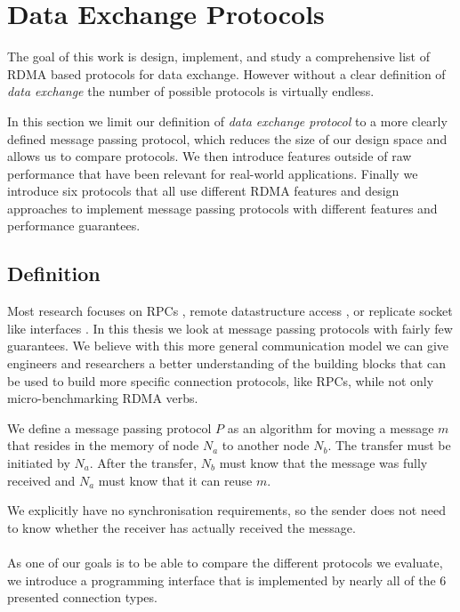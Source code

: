 \section{Data Exchange Protocols}\label{sec:protocols}
The goal of this work is design, implement, and study a comprehensive list of RDMA based protocols for data exchange. 
However without a clear definition of \emph{data exchange} the number of possible protocols is virtually endless.

In this section we limit our definition of \emph{data exchange protocol} to a more clearly defined message passing
protocol, which reduces the size of our design space and allows us to compare protocols. We then introduce
features outside of raw performance that have been relevant for real-world applications. Finally we introduce six 
protocols that all use different RDMA features and design approaches to implement message passing protocols with different 
features and performance guarantees.

\subsection{Definition}\label{sec:proto-def}

Most research focuses on RPCs \cite{anuj-guide, fasst, herd}, remote datastructure access \cite{pilaf, farm}, or replicate 
socket like interfaces \cite{socksdirect}. In this thesis we look at message passing protocols with fairly few guarantees.
We believe with this more general communication model we can give engineers and researchers a better understanding of the 
building blocks that can be  used to build more specific connection protocols, like RPCs, while not only 
micro-benchmarking RDMA verbs.


\begin{defn}
We define a message passing protocol $P$ as an algorithm for moving a message $m$ that resides in the memory of
node $N_a$ to another node $N_b$. The transfer must be initiated by $N_a$. After the transfer, $N_b$ must know that the 
message was fully received and $N_a$ must know that it can reuse $m$.
\end{defn}

We explicitly have no synchronisation requirements, so the sender does not need to know whether the receiver has actually 
received the message.

\paragraph{} As one of our goals is to be able to compare the different protocols we evaluate, we introduce a programming 
interface that is implemented by nearly all of the 6 presented connection types.

